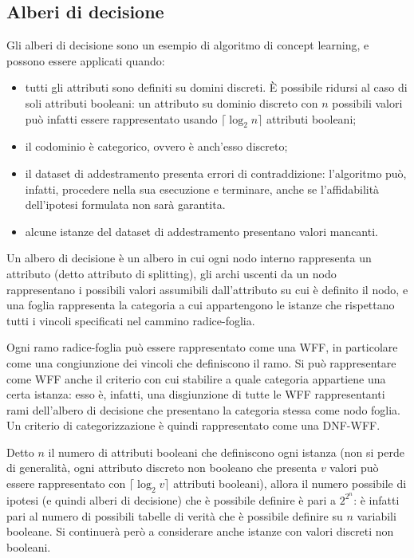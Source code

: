 \subsection{Alberi di decisione}
Gli alberi di decisione sono un esempio di algoritmo di concept learning, e
possono essere applicati quando:
\begin{itemize}
    \item tutti gli attributi sono definiti su domini discreti. È possibile
    ridursi al caso di soli attributi booleani: un attributo su dominio discreto
    con $n$ possibili valori può infatti essere rappresentato usando
    $\lceil \log_2 n \rceil$ attributi booleani;
    \item il codominio è categorico, ovvero è anch'esso discreto;
    \item il dataset di addestramento presenta errori di contraddizione:
    l'algoritmo può, infatti, procedere nella sua esecuzione e terminare, anche
    se l'affidabilità dell'ipotesi formulata non sarà garantita.
    \item alcune istanze del dataset di addestramento presentano valori
    mancanti.
\end{itemize}
Un albero di decisione è un albero in cui ogni nodo interno rappresenta un
attributo (detto attributo di splitting), gli archi uscenti da un nodo
rappresentano i possibili valori assumibili dall'attributo su cui è definito il
nodo, e una foglia rappresenta la categoria a cui appartengono le istanze che
rispettano tutti i vincoli specificati nel cammino radice-foglia.

Ogni ramo radice-foglia può essere rappresentato come una WFF, in particolare
come una congiunzione dei vincoli che definiscono il ramo. Si può rappresentare
come WFF anche il criterio con cui stabilire a quale categoria appartiene una
certa istanza: esso è, infatti, una disgiunzione di tutte le WFF rappresentanti
rami dell'albero di decisione che presentano la categoria stessa come nodo
foglia. Un criterio di categorizzazione è quindi rappresentato come una DNF-WFF.

Detto $n$ il numero di attributi booleani che definiscono ogni istanza
(non si perde di generalità, ogni attributo discreto non booleano che presenta
$v$ valori può essere rappresentato con $\lceil \log_2 v \rceil$ attributi
booleani), allora il numero possibile di ipotesi (e quindi alberi di decisione)
che è possibile definire è pari a $2^{2^n}$: è infatti pari al numero di
possibili tabelle di verità che è possibile definire su $n$ variabili booleane.
Si continuerà però a considerare anche istanze con valori discreti non booleani.

